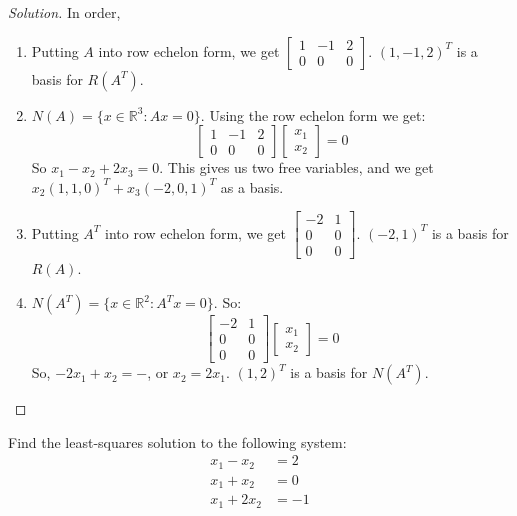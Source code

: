 \documentclass[../main.tex]{subfiles}
\begin{document}
\begin{proof}[Solution]
In order,
\begin{enumerate}
\item Putting $A$ into row echelon form, we get $\begin{bmatrix} 1 & -1 & 2 \\ 0 & 0 & 0 \end{bmatrix}$. $(1,-1,2)^T$ is a basis for $R(A^{T})$.
\item $N(A) = \{x\in \mathbb{R}^3: Ax = 0\}$. Using the row echelon form we get:
\begin{equation*}
    \begin{bmatrix} 1 & -1 & 2 \\ 0 & 0 & 0 \end{bmatrix} \begin{bmatrix} x_1 \\ x_2 \end{bmatrix} = 0
\end{equation*}
So $x_1 - x_2 + 2x_3 = 0$. This gives us two free variables, and we get $x_2(1,1,0)^T + x_3(-2,0,1)^T$ as a basis.
\item Putting $A^T$ into row echelon form, we get $\begin{bmatrix} -2 & 1 \\ 0 & 0 \\ 0 & 0 \end{bmatrix}$. $(-2,1)^T$ is a basis for $R(A)$.
\item $N(A^T) = \{x\in \mathbb{R}^2: A^T x = 0\}$. So:
%
\begin{equation*}
    \begin{bmatrix} -2 & 1 \\ 0 & 0 \\ 0 & 0 \end{bmatrix} \begin{bmatrix} x_1 \\ x_2 \end{bmatrix} = 0    
\end{equation*}
%
So, $-2x_1 + x_2 = -$, or $x_2 = 2x_1$. $(1,2)^T$ is a basis for $N(A^{T})$.
\end{enumerate}
\end{proof}
%
\begin{problem}
Find the least-squares solution to the following system:
\begin{align*}
    x_1 - x_2 &=2\\
    x_1 + x_2 &= 0\\
    x_1 + 2x_2 &=-1
\end{align*}
\end{problem}
\end{document}
